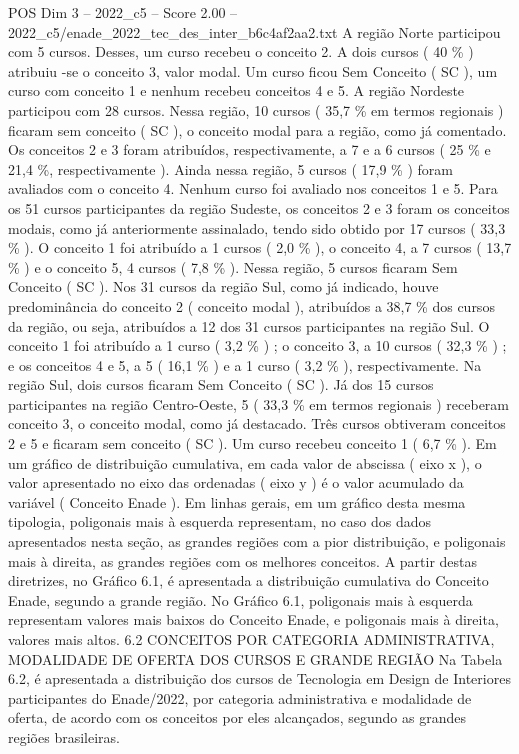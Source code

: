 \begin{textsample}{POS Dim 3 – 2022\_c5 – Score 2.00 – 2022\_c5/enade\_2022\_tec\_des\_inter\_b6c4af2aa2.txt}
A região Norte participou com 5 cursos.
Desses, um curso recebeu o conceito 2.
A dois cursos ( 40 \% ) atribuiu -se o conceito 3, valor modal.
Um curso ficou Sem Conceito ( SC ), um curso com conceito 1 e nenhum recebeu conceitos 4 e 5.
A região Nordeste participou com 28 cursos.
Nessa região, 10 cursos ( 35,7 \% em termos regionais ) ficaram sem conceito ( SC ), o conceito modal para a região, como já comentado.
Os conceitos 2 e 3 foram atribuídos, respectivamente, a 7 e a 6 cursos ( 25 \% e 21,4 \%, respectivamente ).
Ainda nessa região, 5 cursos ( 17,9 \% ) foram avaliados com o conceito 4.
Nenhum curso foi avaliado nos conceitos 1 e 5.
Para os 51 cursos participantes da região Sudeste, os conceitos 2 e 3 foram os conceitos modais, como já anteriormente assinalado, tendo sido obtido por 17 cursos ( 33,3 \% ).
O conceito 1 foi atribuído a 1 cursos ( 2,0 \% ), o conceito 4, a 7 cursos ( 13,7 \% ) e o conceito 5, 4 cursos ( 7,8 \% ).
Nessa região, 5 cursos ficaram Sem Conceito ( SC ).
Nos 31 cursos da região Sul, como já indicado, houve predominância do conceito 2 ( conceito modal ), atribuídos a 38,7 \% dos cursos da região, ou seja, atribuídos a 12 dos 31 cursos participantes na região Sul.
O conceito 1 foi atribuído a 1 curso ( 3,2 \% ) ; o conceito 3, a 10 cursos ( 32,3 \% ) ; e os conceitos 4 e 5, a 5 ( 16,1 \% ) e a 1 curso ( 3,2 \% ), respectivamente.
Na região Sul, dois cursos ficaram Sem Conceito ( SC ).
Já dos 15 cursos participantes na região Centro-Oeste, 5 ( 33,3 \% em termos regionais ) receberam conceito 3, o conceito modal, como já destacado.
Três cursos obtiveram conceitos 2 e 5 e ficaram sem conceito ( SC ).
Um curso recebeu conceito 1 ( 6,7 \% ).
Em um gráfico de distribuição cumulativa, em cada valor de abscissa ( eixo x ), o valor apresentado no eixo das ordenadas ( eixo y ) é o valor acumulado da variável ( Conceito Enade ).
Em linhas gerais, em um gráfico desta mesma tipologia, poligonais mais à esquerda representam, no caso dos dados apresentados nesta seção, as grandes regiões com a pior distribuição, e poligonais mais à direita, as grandes regiões com os melhores conceitos.
A partir destas diretrizes, no Gráfico 6.1, é apresentada a distribuição cumulativa do Conceito Enade, segundo a grande região.
No Gráfico 6.1, poligonais mais à esquerda representam valores mais baixos do Conceito Enade, e poligonais mais à direita, valores mais altos. 6.2 CONCEITOS POR CATEGORIA ADMINISTRATIVA, MODALIDADE DE OFERTA DOS CURSOS E GRANDE REGIÃO Na Tabela 6.2, é apresentada a distribuição dos cursos de Tecnologia em Design de Interiores participantes do Enade/2022, por categoria administrativa e modalidade de oferta, de acordo com os conceitos por eles alcançados, segundo as grandes regiões brasileiras.

\end{textsample}
